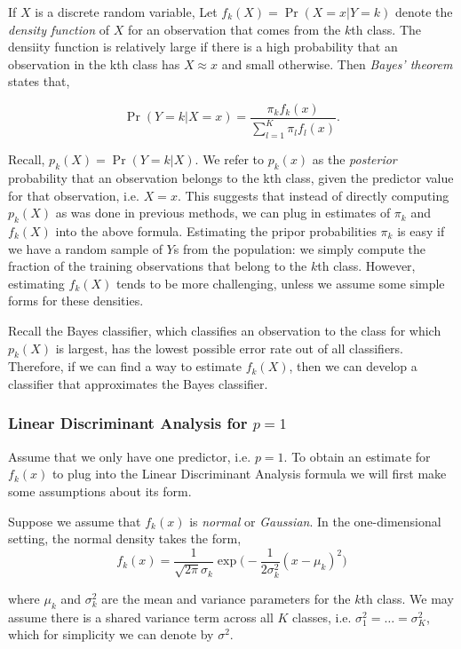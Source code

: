 \documentclass{article}
\numberwithin{equation}{section}
\begin{document}
\begin{enumerate}
If $X$ is a discrete random variable, Let $f_k(X) = \Pr(X = x|Y = k)$ denote
the \textit{density function} of $X$ for an observation that comes from the $k$th class. The densiity function is relatively large if there is a high probability that an observation in the kth class has $X \approx x$ and small otherwise. Then \textit{Bayes’ theorem} states that,

\begin{equation}\label{eq:bayes}
    \Pr(Y = k| X = x) = \frac{\pi_k f_k (x) }{ \sum_{l=1}^{K} \pi_l f_l(x)}.
\end{equation}

Recall, $p_k(X) = \Pr(Y = k|X)$. We refer to $p_k(x)$ as the \textit{posterior} probability that an observation belongs to the kth class, given the predictor value for that observation, i.e. $X = x$. This suggests that instead of directly computing $p_k(X)$ as was done in previous methods, we can plug in estimates of $\pi_k$ and $f_k(X)$ into the above formula. Estimating the pripor probabilities $\pi_k$ is easy if we have a random sample of $Y$s from the population: we simply compute the fraction of the training observations that belong to the $k$th class. However, estimating $f_k(X)$ tends to be more challenging, unless we assume some simple forms for these densities. 

Recall the Bayes classifier, which classifies an observation to the class for which $p_k(X)$ is largest, has the lowest possible error rate out of all classifiers. Therefore, if we can find a way to estimate $f_k(X)$, then we can develop a classifier that approximates the Bayes classifier. 

\subsubsection{Linear Discriminant Analysis for \texorpdfstring{$p=1$}{p = 1}}
Assume that we only have one predictor, i.e. $p=1$. To obtain an estimate for $f_k(x)$ to plug into the Linear Discriminant Analysis formula we will first make some assumptions about its form.

Suppose we assume that $f_k(x)$ is \textit{normal} or \textit{Gaussian}. In the one-dimensional setting, the normal density takes the form,
\begin{equation}\label{eq:gaussian}
    f_k(x) = \frac{1}{\sqrt{2\pi} \sigma_k} \exp \Bigg ( -\frac{1}{2\sigma^2_k} (x-\mu_k)^2 \Bigg) 
\end{equation}

where $\mu_k$ and  $\sigma^2_k$ are the mean and variance parameters for the $k$th class. We may assume there is a shared variance term across all $K$ classes, i.e. $\sigma^2_1 = \dots = \sigma^2_K$, which for simplicity we can denote by $\sigma^2$. 


\end{enumerate}
\end{document}

